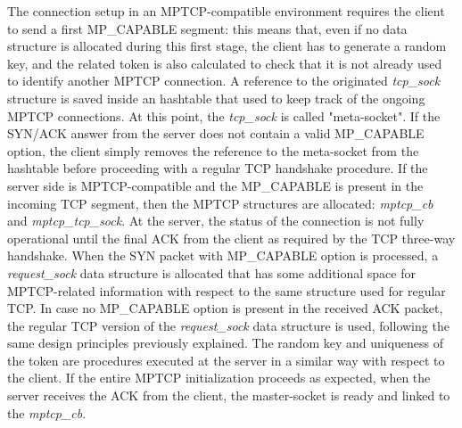 The connection setup in an MPTCP-compatible environment requires the client to send a first MP\_CAPABLE segment: this means that, even if no data structure is allocated during this first stage, the client has to generate a random key, and the related token is also calculated to check that it is not already used to identify another MPTCP connection. A reference to the originated \textit{tcp\_sock} structure is saved inside an hashtable that used to keep track of the ongoing MPTCP connections. At this point, the \textit{tcp\_sock} is called "meta-socket". If the SYN/ACK answer from the server does not contain a valid MP\_CAPABLE option, the client simply removes the reference to the meta-socket from the hashtable before proceeding with a regular TCP handshake procedure. If the server side is MPTCP-compatible and the MP\_CAPABLE is present in the incoming TCP segment, then the MPTCP structures are allocated: \textit{mptcp\_cb} and \textit{mptcp\_tcp\_sock}.
At the server, the status of the connection is not fully operational until the final ACK from the client as required by the TCP three-way handshake. When the SYN packet with MP\_CAPABLE option is processed, a \textit{request\_sock} data structure is allocated that has some additional space for MPTCP-related information with respect to the same structure used for regular TCP. In case no MP\_CAPABLE option is present in the received ACK packet, the regular TCP version of the \textit{request\_sock} data structure is used, following the same design principles previously explained. The random key and uniqueness of the token are procedures executed at the server in a similar way with respect to the client. If the entire MPTCP initialization proceeds as expected, when the server receives the ACK from the client, the master-socket is ready and linked to the \textit{mptcp\_cb}.

